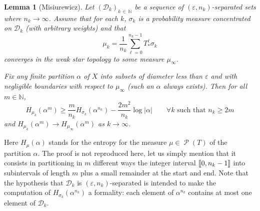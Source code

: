 \documentclass[10pt]{amsart}
\newtheorem{lemm}[theo]{Lemma}\newtheorem{prop}[theo]{Proposition}\newtheorem{coro}[theo]{Corollary}\newtheorem{conj}[theo]{Conjecture}
\theoremstyle{definition}\newtheorem{defi}[theo]{Definition}\newtheorem{rema}[theo]{Remark}\newtheorem{exam}[theo]{Example}\newtheorem{exem}[theo]{Example}\newtheorem{nota}[theo]{Notation}
\theoremstyle{plain}
\theoremstyle{plain}
\newcommand\eps{\varepsilon}
\newcommand\Prob{{\operatorname{\mathscr{P}}}}
\newcommand*\al{\alpha}
\newcommand*\8{\infty}
\newcommand\NN{\mathbb{N}}
\newcommand{\cD}{\mathcal{D}}
\newcommand{\llbracket}{\mathopen{[\mkern -2.7mu[}}
\newcommand{\rrbracket}{\mathclose{]\mkern -2.7mu]}}
\let\oldforall\forall
\renewcommand*{\forall}{\mathrel{\oldforall}}
\begin{document}
\begin{lemm}[Misiurewicz]\label{lem-Misiurewicz}
Let $(\cD_k)_{k\,\in\,\NN}$ be a sequence of $(\eps,n_k)$-separated sets where $n_k\to\infty$. Assume that for each $k$, $\sigma_k$ is a probability measure concentrated on $\cD_k$ (with arbitrary weights) and that
\[
\mu_k = \frac{1}{n_k}\sum_{\ell=0}^{n_k-1} T_*^\ell \sigma_k
\]
converges in the weak star topology to some measure $\mu_\infty$.

Fix any finite partition $\alpha$ of $X$ into subsets of diameter less than $\eps$ and with negligible boundaries with respect to $\mu_\infty$ {(such an $\alpha$ always exists). Then} for all $m\in\NN$,
\[
H_{\mu_k}(\alpha^m) \ge \frac{m}{n_k} H_{\sigma_k}(\alpha^{n_k})-\frac{2m^2}{n_k}\log\lvert\alpha\rvert \qquad \forall k \text{ such that }n_k\ge 2m
\]
and $H_{\mu_k}(\alpha^m)\to H_{\mu_\infty}(\alpha^m)$ as $k\to\infty$.
\end{lemm}

Here $H_{\mu}(\al)$ stands for the entropy for the measure $\mu\in \Prob(T)$ of the partition $\al$. The proof is not reproduced here, let us simply mention that it consists in partitioning in $m$ different ways the integer interval $\llbracket 0, n_k-1\rrbracket$ into subintervals of length $m$ plus a small remainder at the start and end. Note that the hypothesis that $ \cD_k$ is $(\eps,n_k)$-separated is intended to make the computation of $H_{\sigma_k}(\alpha^{ n_k})$ a formality: each element of $\alpha^{ n_k}$ contains at most one element of $ \cD_k$.
\end{document}
